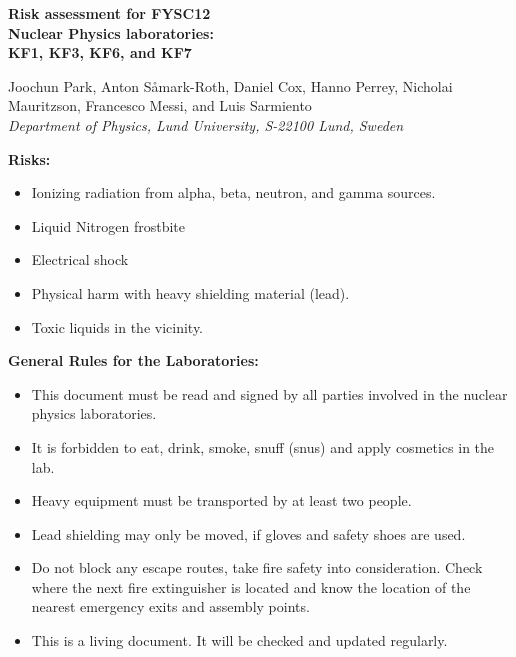 \documentclass[11pt]{article}
\begin{document}
\begin{center}

  {\Large\bf\boldmath Risk assessment for FYSC12\\ Nuclear Physics
    laboratories:}\\[1mm] {\large\bf\boldmath \textsc{KF1}, \textsc{KF3},
    \textsc{KF6}, and \textsc{KF7}}\\
  \vspace*{4mm}

  {\footnotesize Joochun Park, Anton S{\aa}mark-Roth, Daniel Cox, Hanno Perrey, Nicholai Mauritzson, Francesco Messi, and Luis
    Sarmiento}\\
  {\small\it Department of Physics, Lund University,
    S-22100 Lund, Sweden}\\

\end{center}

{\bf Risks:}
\begin{itemize}
\item Ionizing radiation from alpha, beta, neutron, and gamma sources.
\item Liquid Nitrogen frostbite
\item Electrical shock
\item Physical harm with heavy shielding material (lead).
\item Toxic liquids in the vicinity.
\end{itemize}

{\bf General Rules for the Laboratories:}
\begin{itemize}
\item This document must be read and signed by all parties involved in
  the nuclear physics laboratories.
\item It is forbidden to eat, drink, smoke, snuff (snus) and apply
  cosmetics in the lab.
\item Heavy equipment must be transported by at least two people.
\item Lead shielding may only be moved, if gloves and safety shoes are
  used.
\item Do not block any escape routes, take fire safety into
  consideration. Check where the next fire extinguisher is located and
  know the location of the nearest emergency exits and assembly
  points.
\item This is a living document. It will be checked and updated
  regularly.
\end{itemize}
\end{document}
